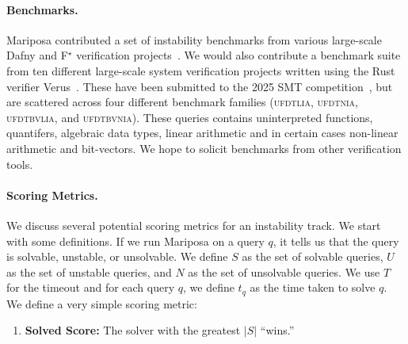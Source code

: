 \documentclass[
]{ceurart}
\newcommand{\fstar}{F${}^\star$\xspace}
\begin{document}
\paragraph{Benchmarks.} Mariposa contributed a set of instability benchmarks
from various large-scale Dafny and \fstar verification projects~\cite{mariposa}. We would
also contribute a benchmark suite from ten different large-scale system
verification projects written using the Rust verifier Verus~\cite{verus-ghost}.
These have been submitted to the 2025 SMT competition~\cite{smtcomp2025verus},
but are scattered across four different benchmark families (\textsc{ufdtlia}, \textsc{ufdtnia}, \textsc{ufdtbvlia}, and \textsc{ufdtbvnia}). These queries contains uninterpreted functions, quantifers, algebraic data types, linear arithmetic and in certain cases non-linear arithmetic and bit-vectors. We hope to solicit benchmarks from other verification tools.



\paragraph{Scoring Metrics.} We discuss several potential scoring metrics for an
instability track. We start with some definitions. If we run Mariposa on a query
$q$, it tells us that the query is solvable, unstable, or unsolvable. We define
$S$ as the set of solvable queries, $U$ as the set of unstable queries, and $N$
as the set of unsolvable queries. We use $T$ for the timeout and for each query
$q$, we define $t_q$ as the time taken to solve $q$. We define a very simple
scoring metric:

\begin{enumerate}[label=\Alph*.]
  \item \textbf{Solved Score:} The solver with the greatest $|S|$ ``wins.''
\end{enumerate}
\end{document}
